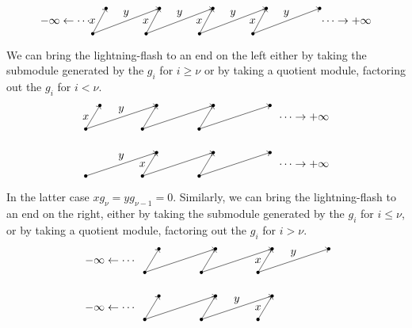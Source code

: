 \documentclass[../main]{subfiles}
\begin{document}
\begin{equation*}
\begin{tikzpicture}[x=0.85cm,y=0.8cm]
  \foreach \a in {0,2,4,6} {\fill (\a,0) circle (1.5pt);}
  \foreach \a in {0.5,2.5,4.5,6.5,8.5} {\fill (\a,1) circle (1.5pt);}
  \draw[->] (0,0)--node[left] {$x$} (0.5,1);
  \draw[->] (0,0)--node[above] {$y$} (2.5,1);
  \draw[->] (2,0)--node[left] {$x$} (2.5,1);
  \draw[->] (2,0)--node[above] {$y$} (4.5,1);
  \draw[->] (4,0)--node[left] {$x$} (4.5,1);
  \draw[->] (4,0)--node[above] {$y$} (6.5,1);
  \draw[->] (6,0)--node[left] {$x$} (6.5,1);
  \draw[->] (6,0)--node[above] {$y$} (8.5,1);
  \node at (-1,0.5) {$-\infty\leftarrow\cdots$};
  \node at (9.5,0.5) {$\cdots\rightarrow+\infty$};
\end{tikzpicture}
\end{equation*}
We can bring the lightning-flash to an end on the left either by taking the
submodule generated by the $g_i$ for $i\ge\nu$ or by taking a quotient module, factoring out the $g_i$ for $i<\nu$.
\begin{equation*}
\begin{tikzpicture}[x=0.9cm,y=0.75cm]
  \foreach \a in {0,2,4} {\fill (\a,0) circle (1.5pt); \fill (\a,-2) circle (1.5pt);}
  \foreach \a in {0.5,2.5,4.5,6.5} {\fill (\a,1) circle (1.5pt);}
  \foreach \a in {2.5,4.5,6.5} {\fill (\a,-1) circle (1.5pt);}
  \draw[->] (0,0)--node[left] {$x$} (0.5,1);
  \draw[->] (0,0)--node[above] {$y$} (2.5,1);
  \draw[->] (2,0)--(2.5,1); \draw[->] (2,0)--(4.5,1);
  \draw[->] (4,0)--(4.5,1); \draw[->] (4,0)--(6.5,1);
  \draw[->] (0,-2)--node[above] {$y$} (2.5,-1);
  \draw[->] (2,-2)--node[left] {$x$} (2.5,-1);
  \draw[->] (2,-2)--(4.5,-1);
  \draw[->] (4,-2)--(4.5,-1); \draw[->] (4,-2)--(6.5,-1);
  \node at (7.7,0.5) {$\cdots\rightarrow+\infty$};
  \node at (7.7,-1.5) {$\cdots\rightarrow+\infty$};
\end{tikzpicture}
\end{equation*}
In the latter case $xg_{\nu}=yg_{\nu-1}=0$. Similarly, we can bring the lightning-flash to an end on the right, either by taking the submodule generated by the $g_{i}$ for $i \leq \nu$, or by taking a quotient module, factoring out the $g_{i}$ for $i>\nu$.
\begin{equation*}
\begin{tikzpicture}[x=0.9cm,y=0.75cm]
  \foreach \a in {0,2,4} {\fill (\a,0) circle (1.5pt); \fill (\a,-2) circle (1.5pt);}
  \foreach \a in {0.5,2.5,4.5,6.5} {\fill (\a,1) circle (1.5pt);}
  \foreach \a in {0.5,2.5,4.5} {\fill (\a,-1) circle (1.5pt);}
  \draw[->] (0,0)--(0.5,1); \draw[->] (0,0)--(2.5,1);
  \draw[->] (2,0)--(2.5,1); \draw[->] (2,0)--(4.5,1);
  \draw[->] (4,0)--node[left] {$x$} (4.5,1);
  \draw[->] (4,0)--node[above] {$y$} (6.5,1);
  \draw[->] (0,-2)--(0.5,-1); \draw[->] (0,-2)--(2.5,-1);
  \draw[->] (2,-2)--(2.5,-1);
  \draw[->] (2,-2)--node[above] {$y$} (4.5,-1);
  \draw[->] (4,-2)--node[left] {$x$} (4.5,-1);
  \node at (-1.2,0.5) {$-\infty\leftarrow\cdots$};
  \node at (-1.2,-1.5) {$-\infty\leftarrow\cdots$};
\end{tikzpicture}
\end{equation*}
\end{document}
